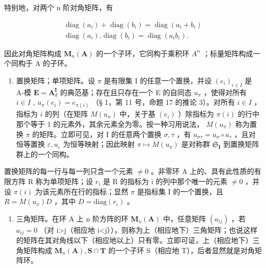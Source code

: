 特别地，对两个 n 阶对角矩阵，有

\[
\begin{array}{c} \operatorname{diag} (a _ {i}) + \operatorname{diag} (b _ {i}) = \operatorname{diag} (a _ {i} + b _ {i}) \\ \operatorname{diag} (a _ {i}). \operatorname{diag} (b _ {i}) = \operatorname{diag} (a _ {i} b _ {i}). \end{array}\tag{31}
\]

因此对角矩阵构成 \(\mathbf{M}_{n}(\mathbf{A})\) 的一个子环，它同构于乘积环 \(A^{n}\) ；标量矩阵构成一个同构于 A 的子环。

\begin{enumerate}
\def\labelenumi{\Roman{enumi}.}
\setcounter{enumi}{1}
\tightlist
\item
  置换矩阵；单项矩阵。设 \(\pi\) 是有限集 I 的任意一个置换，并设 \((e_i)_{i\in I}\) 是 A-模 \(\mathbf{E} = \mathbf{A}_d^{\mathbf{I}}\) 的典范基；存在且只存在一个 E 的自同态 \(u_{\pi}\) ，使得对所有 \(i\in I\) , \(u_{\pi}(e_i) = e_{\pi(i)}\) （§ 1，第 11 号，命题 17 的推论 3）。对所有 \(i\in I\) ，指标为 \(i\) 的列（在矩阵 \(M(u_{\pi})\) 中，关于基 \((e_i)\) ）除指标为 \(\pi(i)\) 的行中那个等于 1 的元素外，其余元素全为零。按一种习用说法， \(M(u_{\pi})\) 称为置换 \(\pi\) 的矩阵。立即可见，对 I 的任意两个置换 \(\sigma, \tau\) ，有 \(u_{\sigma \tau} = u_{\sigma} \circ u_{\tau}\) ，且对恒等置换 \(\varepsilon, u_{\varepsilon}\) 为恒等映射；因此映射 \(\pi \mapsto M(u_{\pi})\) 是对称群 \(\mathfrak{S}_{\mathbf{I}}\) 到置换矩阵群上的一个同构。
\end{enumerate}

置换矩阵的每一行与每一列只含一个元素 \(\neq0\) 。非零环 A 上的、具有此性质的有限方阵 R 称为单项矩阵；设 \(r_{i}\) 是 R 的指标为 i 的列中那个唯一的元素 \(\neq0\) ，并设 \(\pi(i)\) 为该元素所在行的指标；显然 \(\pi\) 是指标集 I 的一个置换，且 \(R=M(u_{\pi})D\) ，其中 \(D=\mathrm{diag}(r_{i})\) 。

\begin{enumerate}
\def\labelenumi{\Roman{enumi}.}
\setcounter{enumi}{2}
\tightlist
\item
  三角矩阵。在环 A 上 n 阶方阵的环 \(\mathbf{M}_{n}(\mathbf{A})\) 中，任意矩阵 \((a_{ij})\) ，若 \(a_{ij}=0\) （对 i\textgreater j（相应地 i\textless j）），则称为上（相应地下）三角矩阵；也说这样的矩阵在其对角线以下（相应地以上）只有零。立即可证，上（相应地下）三角矩阵构成 \(\mathbf{M}_{n}(\mathbf{A}),\mathbf{S}\cap\mathbf{T}\) 的一个子环 S（相应地 T），后者显然就是对角矩阵环。
\end{enumerate}

